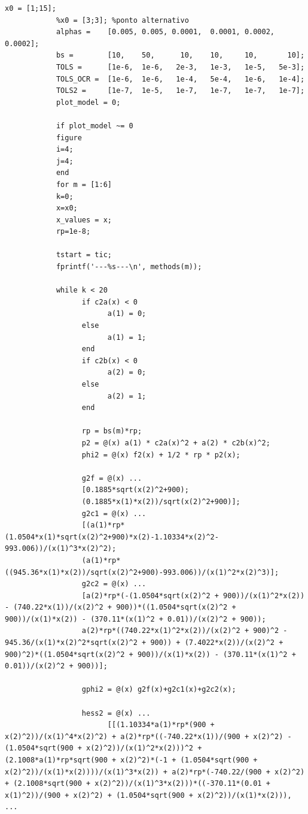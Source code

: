 \documentclass[10pt, a4paper]{article}
\begin{document}
\begin{minipage}{\linewidth}
      \begin{lstlisting}[style=myStyle, caption= trecho de c\'odigo do problema 02 (penalidade) (1/2), label=list_p02_pen_1]
            x0 = [1;15];
            %x0 = [3;3]; %ponto alternativo
            alphas =    [0.005, 0.005, 0.0001,  0.0001, 0.0002, 0.0002];
            bs =        [10,    50,      10,    10,     10,       10];
            TOLS =      [1e-6,  1e-6,   2e-3,   1e-3,   1e-5,   5e-3];
            TOLS_OCR =  [1e-6,  1e-6,   1e-4,   5e-4,   1e-6,   1e-4];
            TOLS2 =     [1e-7,  1e-5,   1e-7,   1e-7,   1e-7,   1e-7];
            plot_model = 0;

            if plot_model ~= 0
            figure
            i=4;
            j=4;
            end
            for m = [1:6]
            k=0;
            x=x0;
            x_values = x;
            rp=1e-8;

            tstart = tic;
            fprintf('---%s---\n', methods(m));

            while k < 20
                  if c2a(x) < 0
                        a(1) = 0;
                  else
                        a(1) = 1;
                  end
                  if c2b(x) < 0
                        a(2) = 0;
                  else
                        a(2) = 1;
                  end

                  rp = bs(m)*rp;
                  p2 = @(x) a(1) * c2a(x)^2 + a(2) * c2b(x)^2;
                  phi2 = @(x) f2(x) + 1/2 * rp * p2(x);

                  g2f = @(x) ...
                  [0.1885*sqrt(x(2)^2+900);
                  (0.1885*x(1)*x(2))/sqrt(x(2)^2+900)];
                  g2c1 = @(x) ...
                  [(a(1)*rp*(1.0504*x(1)*sqrt(x(2)^2+900)*x(2)-1.10334*x(2)^2-993.006))/(x(1)^3*x(2)^2);
                  (a(1)*rp*((945.36*x(1)*x(2))/sqrt(x(2)^2+900)-993.006))/(x(1)^2*x(2)^3)];
                  g2c2 = @(x) ...
                  [a(2)*rp*(-(1.0504*sqrt(x(2)^2 + 900))/(x(1)^2*x(2)) - (740.22*x(1))/(x(2)^2 + 900))*((1.0504*sqrt(x(2)^2 + 900))/(x(1)*x(2)) - (370.11*(x(1)^2 + 0.01))/(x(2)^2 + 900));
                  a(2)*rp*((740.22*x(1)^2*x(2))/(x(2)^2 + 900)^2 - 945.36/(x(1)*x(2)^2*sqrt(x(2)^2 + 900)) + (7.4022*x(2))/(x(2)^2 + 900)^2)*((1.0504*sqrt(x(2)^2 + 900))/(x(1)*x(2)) - (370.11*(x(1)^2 + 0.01))/(x(2)^2 + 900))];

                  gphi2 = @(x) g2f(x)+g2c1(x)+g2c2(x);

                  hess2 = @(x) ...
                        [[(1.10334*a(1)*rp*(900 + x(2)^2))/(x(1)^4*x(2)^2) + a(2)*rp*((-740.22*x(1))/(900 + x(2)^2) - (1.0504*sqrt(900 + x(2)^2))/(x(1)^2*x(2)))^2 + (2.1008*a(1)*rp*sqrt(900 + x(2)^2)*(-1 + (1.0504*sqrt(900 + x(2)^2))/(x(1)*x(2))))/(x(1)^3*x(2)) + a(2)*rp*(-740.22/(900 + x(2)^2) + (2.1008*sqrt(900 + x(2)^2))/(x(1)^3*x(2)))*((-370.11*(0.01 + x(1)^2))/(900 + x(2)^2) + (1.0504*sqrt(900 + x(2)^2))/(x(1)*x(2))), ...
      \end{lstlisting}
\end{minipage}
\end{document}
